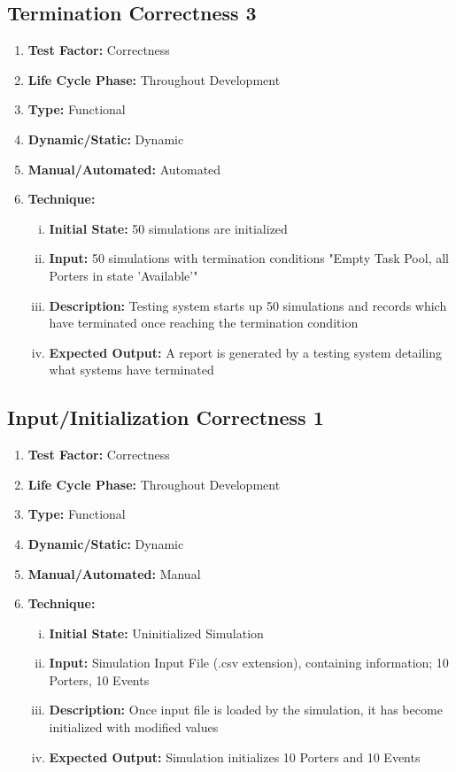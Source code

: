 \documentclass[paper=letter, fontsize=10pt]{scrartcl}
\numberwithin{equation}{section}		%
\numberwithin{figure}{section}			%
\numberwithin{table}{section}				%
\begin{document}
\subsection{Termination Correctness 3}
\begin{enumerate}[]
	\item \textbf{Test Factor:} Correctness
	\item \textbf{Life Cycle Phase:} Throughout Development
	\item \textbf{Type:} Functional
	\item \textbf{Dynamic/Static:} Dynamic
	\item \textbf{Manual/Automated:} Automated
	\item \textbf{Technique:}
		\begin{enumerate}[(i)]
			\item \textbf{Initial State:} 50 simulations are initialized 
			\item \textbf{Input:} 50 simulations with termination conditions "Empty Task Pool, all Porters in state 'Available'"
			\item \textbf{Description:} Testing system starts up 50 simulations and records which have terminated once reaching the termination condition 
			\item \textbf{Expected Output:} A report is generated by a testing system detailing what systems have terminated
		\end{enumerate}
\end{enumerate}

\subsection{Input/Initialization Correctness 1}
\begin{enumerate}[]
	\item \textbf{Test Factor:} Correctness  
	\item \textbf{Life Cycle Phase:} Throughout Development
	\item \textbf{Type:} Functional
	\item \textbf{Dynamic/Static:} Dynamic
	\item \textbf{Manual/Automated:} Manual
	\item \textbf{Technique:}
		\begin{enumerate}[(i)]
			\item \textbf{Initial State:} Uninitialized Simulation   
			\item \textbf{Input:} Simulation Input File (.csv extension), containing information; 10 Porters, 10 Events
			\item \textbf{Description:} Once input file is loaded by the simulation, it has become initialized with modified values
			\item \textbf{Expected Output:} Simulation initializes 10 Porters and 10 Events
		\end{enumerate}
\end{enumerate}
\end{document}
